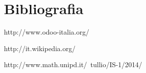 \thispagestyle{empty}
\section{Bibliografia}

http://www.odoo-italia.org/

http://it.wikipedia.org/

http://www.math.unipd.it/~tullio/IS-1/2014/